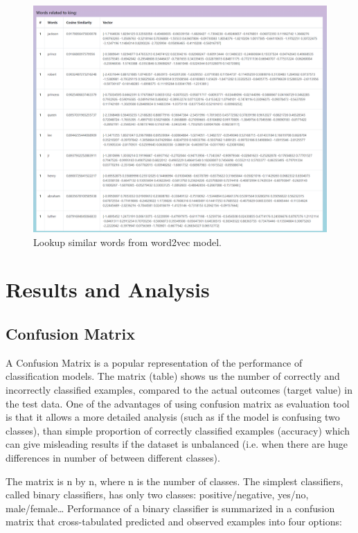 \begin{figure}[tbh]
\begin{center}
	\includegraphics[width=5.85in]{images/outputs/lookup.png}
	\caption{Lookup similar words from word2vec model.}
	\label{lookup}
\end{center}
\end{figure}

\newpage
\chapter{Results and Analysis}
\section{Confusion Matrix}
A Confusion Matrix is a popular representation of the performance of classification models. The matrix (table) shows us the number of correctly and incorrectly classified examples, compared to the actual outcomes (target value) in the test data. One of the advantages of using confusion matrix as evaluation tool is that it allows a more detailed analysis (such as if the model is confusing two classes), than simple proportion of correctly classified examples (accuracy) which can give misleading results if the dataset is unbalanced (i.e. when there are huge differences in number of between different classes).

The matrix is n by n, where n is the number of classes. The simplest classifiers, called binary classifiers, has only two classes: positive/negative, yes/no, male/female… Performance of a binary classifier is summarized in a confusion matrix that cross-tabulated predicted and observed examples into four options:

